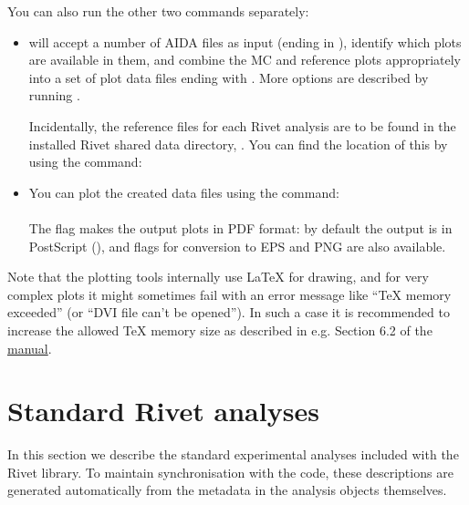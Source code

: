 \documentclass{JHEP3}
\begin{document}
You can also run the other two commands separately:
%
\begin{itemize}
\item {} will accept a number of AIDA files as input (ending in
), identify which plots are available in them, and combine the MC
and reference plots appropriately into a set of plot data files ending with
. More options are described by running .

Incidentally, the reference files for each Rivet analysis are to be found in the
installed Rivet shared data directory, . You
can find the location of this by using the  command:\\

\item You can plot the created data files using the  command:\\
\\
The  flag makes the output plots in PDF format: by default the output
is in PostScript (), and flags for conversion to EPS and PNG are also
available.
\end{itemize}

Note that the plotting tools internally use \LaTeX{} for drawing, and for very
complex plots it might sometimes fail with an error message like
``TeX memory exceeded'' (or ``DVI file can't be opened''). In such
a case it is recommended to increase the allowed \TeX{} memory size as described
in e.g. Section 6.2 of the \href{http://pgfplots.sourceforge.net/pgfplots.pdf}{ manual}.



\cleardoublepage
\part{Standard Rivet analyses}
\label{part:analyses}


In this section we describe the standard experimental analyses included with the
Rivet library. To maintain synchronisation with the code, these descriptions are
generated automatically from the metadata in the analysis objects
themselves.
\end{document}
